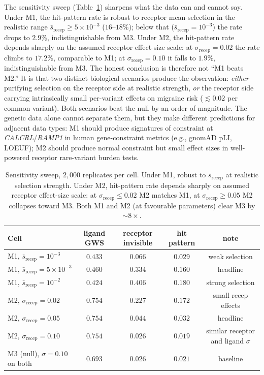 \documentclass[11pt]{article}
\begin{document}
The sensitivity sweep (Table~\ref{tab:sim_sens}) sharpens what the data can and cannot say. Under M1, the hit-pattern rate is robust to receptor mean-selection in the realistic range $\bar{s}_{\text{recep}} \geq 5 \times 10^{-3}$ ($16$--$18\%$); below that ($\bar{s}_{\text{recep}} = 10^{-3}$) the rate drops to $2.9\%$, indistinguishable from M3. Under M2, the hit-pattern rate depends sharply on the assumed receptor effect-size scale: at $\sigma_{\text{recep}} = 0.02$ the rate climbs to $17.2\%$, comparable to M1; at $\sigma_{\text{recep}} = 0.10$ it falls to $1.9\%$, indistinguishable from M3. The honest conclusion is therefore not ``M1 beats M2.'' It is that two distinct biological scenarios produce the observation: \emph{either} purifying selection on the receptor side at realistic strength, \emph{or} the receptor side carrying intrinsically small per-variant effects on migraine risk ($\lesssim 0.02$ per common variant). Both scenarios beat the null by an order of magnitude. The genetic data alone cannot separate them, but they make different predictions for adjacent data types: M1 should produce signatures of constraint at \textit{CALCRL}/\textit{RAMP1} in human gene-constraint metrics (e.g., gnomAD pLI, LOEUF); M2 should produce normal constraint but small effect sizes in well-powered receptor rare-variant burden tests.

\begin{table}[h]
\centering
\caption{Sensitivity sweep, $2{,}000$ replicates per cell. Under M1, robust to $\bar{s}_{\text{recep}}$ at realistic selection strength. Under M2, hit-pattern rate depends sharply on assumed receptor effect-size scale: at $\sigma_{\text{recep}} \leq 0.02$ M2 matches M1, at $\sigma_{\text{recep}} \geq 0.05$ M2 collapses toward M3. Both M1 and M2 (at favourable parameters) clear M3 by $\sim 8\times$.}
\label{tab:sim_sens}
\small
\begin{tabular}{l c c c c}
\toprule
Cell & ligand GWS & receptor invisible & \textbf{hit pattern} & note \\
\midrule
M1, $\bar{s}_{\text{recep}} = 10^{-3}$  & $0.433$ & $0.066$ & $\mathbf{0.029}$ & weak selection \\
M1, $\bar{s}_{\text{recep}} = 5 \times 10^{-3}$  & $0.460$ & $0.334$ & $\mathbf{0.160}$ & headline \\
M1, $\bar{s}_{\text{recep}} = 10^{-2}$  & $0.424$ & $0.406$ & $\mathbf{0.180}$ & strong selection \\
\midrule
M2, $\sigma_{\text{recep}} = 0.02$ & $0.754$ & $0.227$ & $\mathbf{0.172}$ & small recep effects \\
M2, $\sigma_{\text{recep}} = 0.05$ & $0.754$ & $0.044$ & $\mathbf{0.032}$ & headline \\
M2, $\sigma_{\text{recep}} = 0.10$ & $0.754$ & $0.026$ & $\mathbf{0.019}$ & similar receptor and ligand $\sigma$ \\
\midrule
M3 (null), $\sigma = 0.10$ on both & $0.693$ & $0.026$ & $\mathbf{0.021}$ & baseline \\
\bottomrule
\end{tabular}
\end{table}
\end{document}
